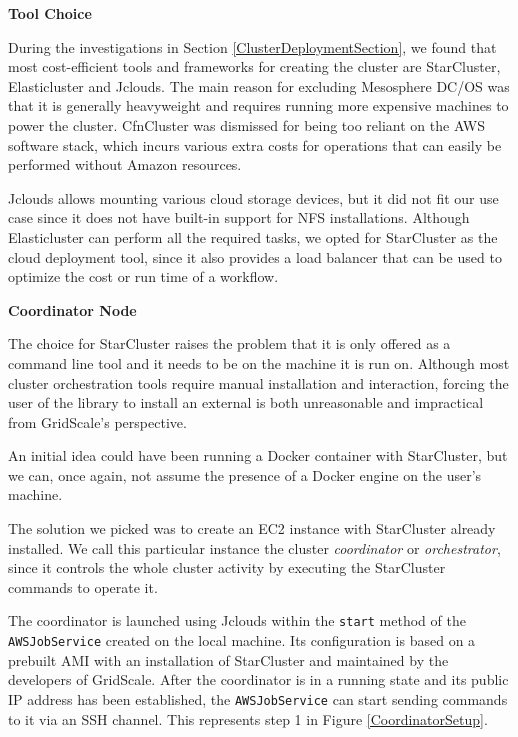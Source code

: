 \textbf{Tool Choice}

During the investigations in Section \ref{ClusterDeploymentSection}, we found that most cost-efficient tools and frameworks for creating the cluster are StarCluster, Elasticluster and Jclouds. The main reason for excluding Mesosphere DC/OS was that it is generally heavyweight and requires running more expensive machines to power the cluster. CfnCluster was dismissed for being too reliant on the AWS software stack, which incurs various extra costs for operations that can easily be performed without Amazon resources.

Jclouds allows mounting various cloud storage devices, but it did not fit our use case since it does not have built-in support for NFS installations. Although Elasticluster can perform all the required tasks, we opted for StarCluster as the cloud deployment tool, since it also provides a load balancer that can be used to optimize the cost or run time of a workflow.

\vspace{3mm}
\textbf{Coordinator Node}
\vspace{1mm}

The choice for StarCluster raises the problem that it is only offered as a command line tool and it needs to be on the machine it is run on. Although most cluster orchestration tools require manual installation and interaction, forcing the user of the library to install an external is both unreasonable and impractical from GridScale's perspective. 

An initial idea could have been running a Docker container with StarCluster, but we can, once again, not assume the presence of a Docker engine on the user's machine.

The solution we picked was to create an EC2 instance with StarCluster already installed. We call this particular instance the cluster \textit{coordinator} or \textit{orchestrator}, since it controls the whole cluster activity by executing the StarCluster commands to operate it. 

The coordinator is launched using Jclouds within the \verb|start| method of the \verb|AWSJobService| created on the local machine. Its configuration is based on a prebuilt AMI with an installation of StarCluster and maintained by the developers of GridScale. After the coordinator is in a running state and its public IP address has been established, the \verb|AWSJobService| can start sending commands to it via an SSH channel. This represents step 1 in Figure \ref{CoordinatorSetup}.

